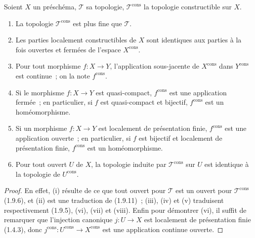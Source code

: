 \begin{proposition}[1.9.14]
\label{IV.1.9.14-fr}
Soient $X$ un préschéma, $\mathscr T$ sa topologie,
$\mathscr T^{\mathrm{cons}}$ la topologie constructible sur $X$.
\begin{enumerate}
  \item[(i)] La topologie $\mathscr T^{\mathrm{cons}}$ est plus fine que
  $\mathscr T$.
  \item[(ii)] Les parties localement constructibles de $X$ sont identiques
  aux parties à la fois ouvertes et fermées de l'espace $X^{\mathrm{cons}}$.
  \item[(iii)] Pour tout morphisme $f:X\to Y$, l'application sous-jacente de
  $X^{\mathrm{cons}}$ dans $Y^{\mathrm{cons}}$ est continue~; on la note
  $f^{\mathrm{cons}}$.
  \item[(iv)] Si le morphisme $f:X\to Y$ est quasi-compact,
  $f^{\mathrm{cons}}$ est une application fermée~; en particulier, si $f$
  est quasi-compact et bijectif, $f^{\mathrm{cons}}$ est un homéomorphisme.
  \item[(v)] Si un morphisme $f:X\to Y$ est localement de présentation
  finie, $f^{\mathrm{cons}}$ est une application ouverte~; en particulier,
  si $f$ est bijectif et localement de présentation finie,
  $f^{\mathrm{cons}}$ est un homéomorphisme.
  \item[(vi)] Pour tout ouvert $U$ de $X$, la topologie induite par
  $\mathscr T^{\mathrm{cons}}$ sur $U$ est identique à la topologie de
  $U^{\mathrm{cons}}$.
\end{enumerate}
\end{proposition}

\begin{proof}
En effet, (i) résulte de ce que tout ouvert pour $\mathscr T$ est un ouvert
pour $\mathscr T^{\mathrm{cons}}$ (1.9.6), et (ii) est une traduction de
(1.9.11)~; (iii), (iv) et (v) traduisent respectivement (1.9.5), (vi), (vii)
et (viii). Enfin pour démontrer (vi), il suffit de remarquer que l'injection
canonique $j:U\to X$ est localement de présentation finie (1.4.3), donc
$j^{\mathrm{cons}}:U^{\mathrm{cons}}\to X^{\mathrm{cons}}$ est une
application continue ouverte.
\end{proof}

